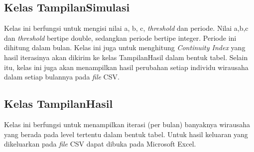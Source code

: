 \subsection{Kelas TampilanSimulasi}
Kelas ini berfungsi untuk mengisi nilai a, b, c, \textit{threshold} dan periode. Nilai a,b,c dan \textit{threshold} bertipe double, sedangkan periode bertipe integer. Periode ini dihitung dalam bulan. Kelas ini juga untuk menghitung \textit{Continuity Index} yang hasil iterasinya akan dikirim ke kelas TampilanHasil dalam bentuk tabel. Selain itu, kelas ini juga akan menampilkan hasil perubahan setiap individu wirausaha dalam setiap bulannya pada \textit{file} CSV.

\subsection{Kelas TampilanHasil}
Kelas ini berfungsi untuk menampilkan iterasi (per bulan) banyaknya wirausaha yang berada pada level tertentu dalam bentuk tabel. Untuk hasil keluaran yang dikeluarkan pada \textit{file} CSV dapat dibuka pada Microsoft Excel.

